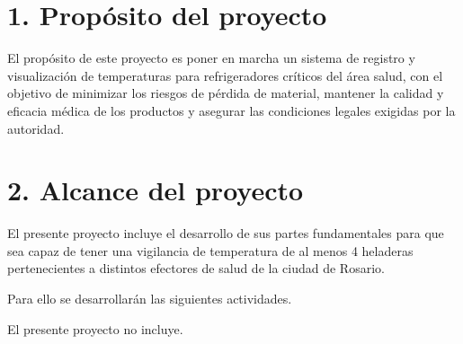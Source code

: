 \section{1. Propósito del proyecto}
\label{sec:proposito}


El propósito de este proyecto es poner en marcha un sistema de registro y visualización de temperaturas para refrigeradores críticos del área salud, con el objetivo de minimizar los riesgos de pérdida de material, mantener la calidad y eficacia médica de los productos y asegurar las condiciones legales exigidas por la autoridad.


\section{2. Alcance del proyecto}
\label{sec:alcance}


El presente proyecto incluye el desarrollo de sus partes fundamentales para que sea capaz de tener una vigilancia de temperatura de al menos 4 heladeras pertenecientes a distintos efectores de salud de la ciudad de Rosario. 

Para ello se desarrollarán las siguientes actividades.



El presente proyecto no incluye.